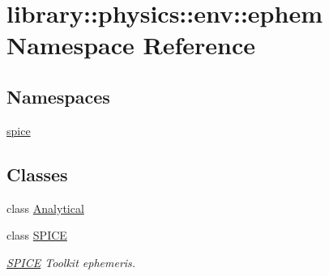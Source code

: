 \hypertarget{namespacelibrary_1_1physics_1_1env_1_1ephem}{}\section{library\+:\+:physics\+:\+:env\+:\+:ephem Namespace Reference}
\label{namespacelibrary_1_1physics_1_1env_1_1ephem}
\subsection*{Namespaces}
\begin{DoxyCompactItemize}
\item 
 \hyperlink{namespacelibrary_1_1physics_1_1env_1_1ephem_1_1spice}{spice}
\end{DoxyCompactItemize}
\subsection*{Classes}
\begin{DoxyCompactItemize}
\item 
class \hyperlink{classlibrary_1_1physics_1_1env_1_1ephem_1_1_analytical}{Analytical}
\item 
class \hyperlink{classlibrary_1_1physics_1_1env_1_1ephem_1_1_s_p_i_c_e}{S\+P\+I\+CE}
\begin{DoxyCompactList}\small\item\em \hyperlink{classlibrary_1_1physics_1_1env_1_1ephem_1_1_s_p_i_c_e}{S\+P\+I\+CE} Toolkit ephemeris. \end{DoxyCompactList}\end{DoxyCompactItemize}
